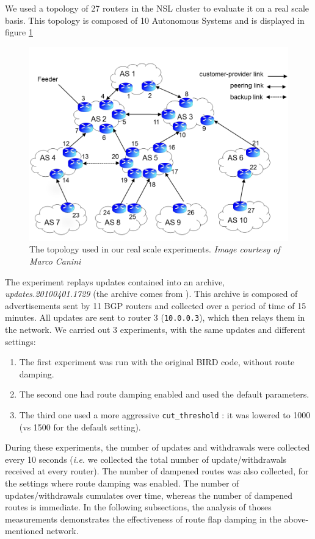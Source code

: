 \documentclass[a4paper,english]{IEEEtran}
\begin{document}
We used a topology of 27 routers in the NSL cluster to evaluate
it on a real scale basis.
This topology is composed of 10 Autonomous Systems and is displayed in figure \ref{fig_topo}
\begin{figure}
\begin{center}
\includegraphics[scale=.3]{img/topology.png}
\end{center}
\caption{The topology used in our real scale experiments. \textit{Image courtesy of Marco Canini}}
\label{fig_topo}
\end{figure}

The experiment replays updates contained into an archive,
\textsl{updates.20100401.1729} (the archive comes from \cite{routeviews}).
This archive is composed of advertisements sent by 11 BGP routers and collected
over a period of time of 15 minutes.
All updates are sent to router 3 (\texttt{\small 10.0.0.3}), which then relays them
in the network.
We carried out 3 experiments, with the same updates and different settings:

\begin{enumerate}
\item The first experiment was run with the original BIRD code, without route damping.
\item The second one had route damping enabled and used the default parameters.
\item The third one used a more aggressive \texttt{\small cut\_threshold} : 
it was lowered to 1000 (vs 1500 for the default setting).
\end{enumerate}

During these experiments, the number of updates and withdrawals were collected every 10 seconds 
(\textit{i.e.} we collected the total number of update/withdrawals received at every router).
The number of dampened routes was also collected, for the settings where route damping was enabled.
The number of updates/withdrawals cumulates over time, whereas the number of dampened routes is immediate.
In the following subsections, the analysis of thoses measurements demonstrates the effectiveness
of route flap damping in the above-mentioned network.
\end{document}
